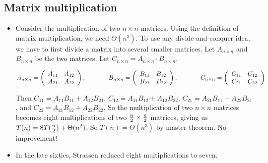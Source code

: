 \documentclass{article}
\begin{document}
\subsection{Matrix multiplication}


\begin{itemize}

\item Consider the multiplication of two $n\times n$ matrices.
Using the definition of matrix multiplication, we need $\Theta(n^3)$.
To use any divide-and-conquer idea, we have to first divide a matrix
into several smaller matrices. Let $A_{n\times n}$ and $B_{n\times n}$
be the two matrices. Let $C_{n\times n}=A_{n\times n}\cdot B_{n\times n}$.

$$A_{n\times n}=\left ( \begin{array}{cc}
A_{11} & A_{12}\\
A_{21} & A_{22}\\
\end{array} \right),\hskip 0.5in
B_{n\times n}=\left ( \begin{array}{cc}
B_{11} & B_{12}\\
B_{21} & B_{22}\\
\end{array} \right),\hskip 0.5in
C_{n\times n}=\left ( \begin{array}{cc}
C_{11} & C_{12}\\
C_{21} & C_{22}\\
\end{array} \right)$$

Then $C_{11}=A_{11}B_{11}+A_{12}B_{21}$, $C_{12}=A_{11}B_{12}+A_{12}B_{22}$,
$C_{21}=A_{21}B_{11}+A_{22}B_{21}$, and $C_{22}=A_{21}B_{12}+A_{22}B_{22}$.
So the multiplication of two $n\times n$ matrices becomes eight multiplications
of two ${n\over2}\times{n\over2}$ matrices, giving us $T(n)=8T({n\over2})+
\Theta(n^2)$. So $T(n)=\Theta(n^3)$ by master theorem. No improvement!

\item In the late sixties, Strassen reduced eight multiplications to seven.


\end{itemize}
\end{document}
